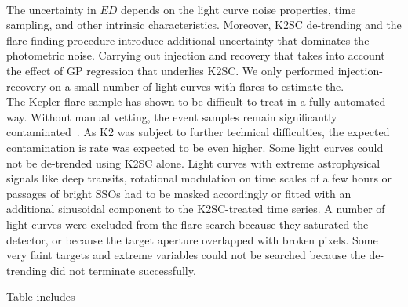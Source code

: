 \documentclass{aa}
\begin{document}
\\
The uncertainty in $ED$ depends on the light curve noise properties, time sampling, and other intrinsic characteristics. Moreover, K2SC de-trending and the flare finding procedure introduce additional uncertainty that dominates the photometric noise. Carrying out injection and recovery that takes into account the effect of GP regression that underlies K2SC. We only performed injection-recovery on a small number of light curves with flares to estimate the.
\\
The Kepler flare sample has shown to be difficult to treat in a fully automated way. Without manual vetting, the event samples remain significantly contaminated~\citep{yang_keplerflares_2019}. As K2 was subject to further technical difficulties, the expected contamination is rate was expected to be even higher. Some light curves could not be de-trended using K2SC alone. Light curves with extreme astrophysical signals like deep transits, rotational modulation on time scales of a few hours or passages of bright SSOs had to be masked accordingly or fitted with an additional sinusoidal component to the K2SC-treated time series. A number of light curves were excluded from the flare search because they saturated the detector, or because the target aperture overlapped with broken pixels. Some very faint targets and extreme variables could not be searched because the de-trending did not terminate successfully. 

Table includes 
\\
\end{document}
